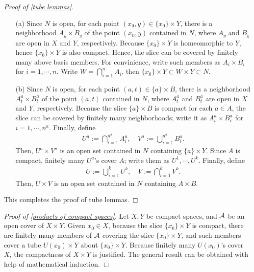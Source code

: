 \begin{proof}[Proof of \cref{tube lemmas}]
    \begin{enumerate}
        \item[(a)]
            Since $N$ is open, for each point $(x_0, y)\in\{x_0\}\times Y$, there is a neighborhood $A_y\times B_y$ of the point $(x_0, y)$ contained in $N$, where $A_y$ and $B_y$ are open in $X$ and $Y$, respectively.
            Because $\{x_0\}\times Y$ is homeomorphic to $Y$, hence $\{x_0\}\times Y$ is also compact.
            Hence, the slice can be covered by finitely many above basis members.
            For convinience, write such members as $A_i\times B_i$ for $i=1, \cdots, n$.
            Write $W=\bigcap_{i=1}^n A_i$, then $\{x_0\}\times Y\subset W\times Y\subset N$.
        \item[(b)]
            Since $N$ is open, for each point $(a, t)\in\{a\}\times B$, there is a neighborhood $A_t^a\times B_t^a$ of the point $(a, t)$ contained in $N$, where $A_t^a$ and $B_t^a$ are open in $X$ and $Y$, respectively.
            Because the slice $\{a\}\times B$ is compact for each $a\in A$, the slice can be covered by finitely many neighborhoods; write it as $A_i^a\times B_i^a$ for $i=1, \cdots, n^a$.
            Finally, define
            \begin{align*}
                U^a:=\bigcap_{i=1}^{n^a}{A_i^a},\quad V^a:=\bigcup_{i=1}^{n^a}{B_i^a}.
            \end{align*}
            Then, $U^a\times V^a$ is an open set contained in $N$ containing $\{a\}\times Y$.
            Since $A$ is compact, finitely many $U^a$'s cover $A$; write them as $U^1, \cdots, U^k$.
            Finally, define
            \begin{align*}
                U:=\bigcup_{i=1}^k U^k,\quad V:=\bigcap_{i=1}^k V^k.
            \end{align*}
            Then, $U\times V$ is an open set contained in $N$ containing $A\times B$.
    \end{enumerate}
    This completes the proof of tube lemmas.
\end{proof}
\begin{proof}[Proof of \cref{products of compact spaces}]
    Let $X, Y$ be compact spaces, and ${\mathcal{A}}$ be an open cover of $X\times Y$.
    Given $x_0\in X$, because the slice $\{x_0\}\times Y$ is compact, there are finitely many members of ${\mathcal{A}}$ covering the slice $\{x_0\}\times Y$, and such members cover a tube $U(x_0)\times Y$ about $\{x_0\}\times Y$.
    Because finitely many $U(x_0)$'s cover $X$, the compactness of $X\times Y$ is justified.
    The general result can be obtained with help of mathematical induction.
\end{proof}

